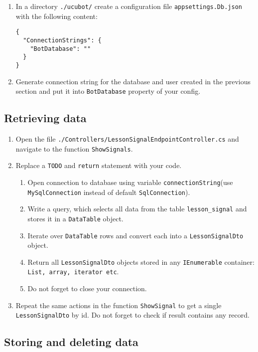 \documentclass[12pt]{article}
\newcommand{\code}[1]{\texttt{#1}}
\begin{document}
\begin{enumerate}
\item In a directory \code{./ucubot/} create a configuration file \code{appsettings.Db.json} with the following content:
\begin{verbatim}
{
  "ConnectionStrings": {
    "BotDatabase": ""
  }
}
\end{verbatim}
\item Generate connection string for the database and user created in the previous section and put it into \code{BotDatabase} property of your config.
\end{enumerate}

\subsection*{Retrieving data}

\begin{enumerate}
\item Open the file \code{./Controllers/LessonSignalEndpointController.cs} and navigate to the function \code{ShowSignals}.
\item Replace a \code{TODO} and \code{return} statement with your code.
\begin{enumerate}
\item Open connection to database using variable \code{connectionString}(use \code{MySqlConnection} instead of default \code{SqlConnection}).
\item Write a query, which selects all data from the table  \code{lesson\_signal} and stores it in a \code{DataTable} object.
\item Iterate over \code{DataTable} rows and convert each into a \code{LessonSignalDto} object.
\item Return all \code{LessonSignalDto} objects stored in any \code{IEnumerable} container: \code{List, array, iterator etc}.
\item Do not forget to close your connection.
\end{enumerate}
\item Repeat the same actions in the function \code{ShowSignal} to get a single \code{LessonSignalDto} by id. Do not forget to check if result contains any record.
\end{enumerate}

\subsection*{Storing and deleting data}
\end{document}
